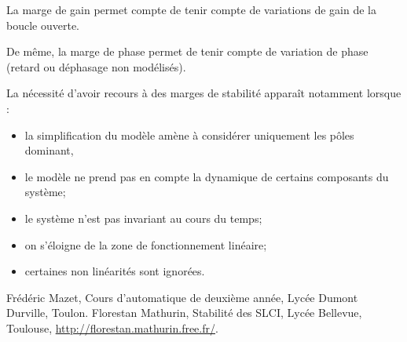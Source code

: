  
La marge de gain permet compte de tenir compte de variations de gain de la boucle ouverte. 

De même, la marge de phase permet de tenir compte de variation de phase (retard ou déphasage non modélisés). 

La nécessité d'avoir recours à des marges de stabilité apparaît notamment lorsque : 
\begin{itemize}
\item la simplification du modèle amène à considérer uniquement les pôles dominant, 
\item le modèle ne prend pas en compte la dynamique de certains composants du système;
\item le système n'est pas invariant au cours du temps;
\item on s'éloigne de la zone de fonctionnement linéaire;
\item certaines non linéarités sont ignorées.
\end{itemize}

\begin{thebibliography}{2}
    Frédéric Mazet, {Cours d'automatique de deuxième année, Lycée Dumont Durville, Toulon.}
       Florestan Mathurin, {Stabilité des SLCI, Lycée Bellevue, Toulouse, \url{http://florestan.mathurin.free.fr/}.}

\end{thebibliography}

